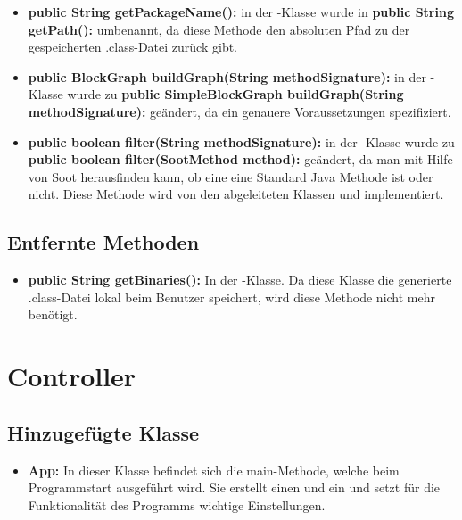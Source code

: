 \begin{itemize}
	\item \textbf{public String getPackageName():} in der -Klasse wurde in \textbf{public String getPath():} umbenannt, da diese Methode den absoluten Pfad zu der gespeicherten .class-Datei zurück gibt.
	
	\item \textbf{public BlockGraph buildGraph(String methodSignature):} in der -Klasse wurde zu \textbf{public SimpleBlockGraph buildGraph(String methodSignature):} geändert, da ein  genauere Voraussetzungen spezifiziert.
	
	\item \textbf{public boolean filter(String methodSignature):} in der -Klasse wurde zu \textbf{public boolean filter(SootMethod method):} geändert, da man mit Hilfe von Soot herausfinden kann, ob eine  eine Standard Java Methode ist oder nicht. Diese Methode wird von den abgeleiteten Klassen  und  implementiert.
\end{itemize}

\subsection{Entfernte Methoden}

\begin{itemize}
	\item \textbf{public String getBinaries():} In der -Klasse. Da diese Klasse die generierte .class-Datei lokal beim Benutzer speichert, wird diese Methode nicht mehr benötigt.
\end{itemize}


\section{Controller}

\subsection{Hinzugefügte Klasse}

\begin{itemize}
	\item \textbf{App:} In dieser Klasse befindet sich die main-Methode, welche beim Programmstart ausgeführt wird. Sie erstellt einen  und ein  und setzt für die Funktionalität des Programms wichtige Einstellungen.
\end{itemize}


